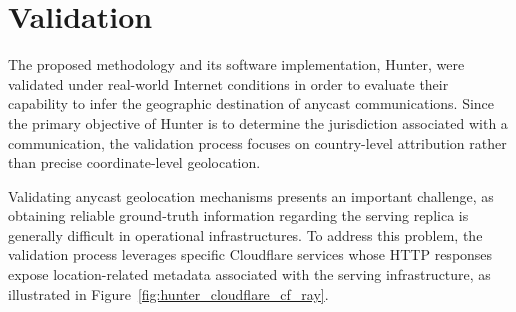 \documentclass[
A4paper,                %
twoside,                %
openright,              %
chapterprefix=true,     %
12pt,                   %
headings=normal,        %
titlepage=on            %
]{book}
\begin{document}
\section{Validation}
\label{sc:hunter_validation}

The proposed methodology and its software implementation, Hunter, were validated under real-world Internet conditions in order to evaluate their capability to infer the geographic destination of anycast communications. Since the primary objective of Hunter is to determine the jurisdiction associated with a communication, the validation process focuses on country-level attribution rather than precise coordinate-level geolocation.

Validating anycast geolocation mechanisms presents an important challenge, as obtaining reliable ground-truth information regarding the serving replica is generally difficult in operational infrastructures. To address this problem, the validation process leverages specific Cloudflare services whose HTTP responses expose location-related metadata associated with the serving infrastructure, as illustrated in Figure~\ref{fig:hunter_cloudflare_cf_ray}.
\end{document}
